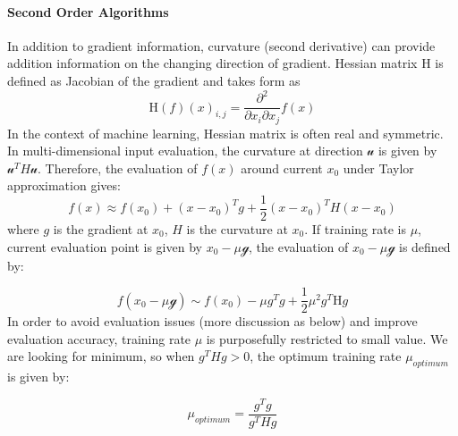 \paragraph{Second Order Algorithms}
In addition to gradient information, curvature (second derivative) can provide addition information on the changing direction of gradient. Hessian matrix $\mathrm{H}$ is defined as Jacobian of the gradient and takes form as 
\begin{equation}
    \mathrm{H}(f)(x)_{i,j} = \frac{\partial^2}{\partial x_i \partial x_j}f(x)
\end{equation}
In the context of machine learning, Hessian matrix is often real and symmetric. In multi-dimensional input evaluation, the curvature at direction $\mathcal{u}$ is given by $\mathcal{u}^TH\mathcal{u}$. Therefore, the evaluation of $f(x)$ around current $x_0$ under Taylor approximation gives:
\begin{equation}
    \label{eq:TaylorEvaluation}
    f(x) \approx f(x_0)+(x-x_0)^Tg+\frac{1}{2}(x-x_0)^TH(x-x_0)
\end{equation}
where $g$ is the gradient at $x_0$, $H$ is the curvature at $x_0$. If training rate is $\mu$, current evaluation point is given by $x_0-\mu\mathcal{g}$, the evaluation of $x_0-\mu\mathcal{g}$ is defined by:

\begin{equation}
\label{eq:TaylorEvaStep}
    f(x_0-\mu\mathcal{g}) \sim f(x_0) - \mu g^Tg + \frac{1}{2}\mu^2g^T\mathrm{H}g
\end{equation}
In order to avoid evaluation issues (more discussion as below) and improve evaluation accuracy, training rate $\mu$ is purposefully restricted to small value. We are looking for minimum, so when $g^THg > 0$, the optimum training rate $\mu_{optimum}$ is given by:

\begin{equation}
    \mu_{optimum} = \frac{g^Tg}{g^THg}
\end{equation}

